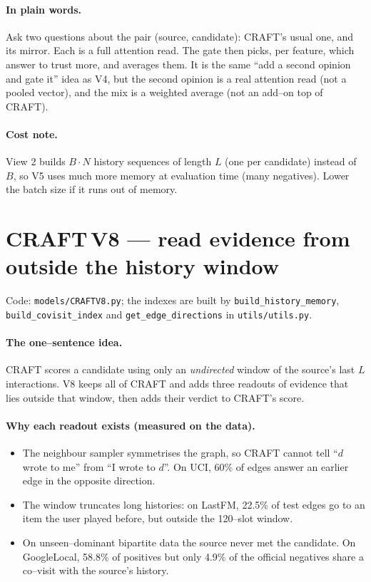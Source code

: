 \documentclass[11pt]{article}
\newcommand{\code}[1]{\texttt{\small #1}}
\begin{document}
\paragraph{In plain words.}
Ask two questions about the pair (source, candidate): CRAFT's usual one, and its
mirror. Each is a full attention read. The gate then picks, per feature, which
answer to trust more, and averages them. It is the same ``add a second opinion
and gate it'' idea as V4, but the second opinion is a real attention read (not a
pooled vector), and the mix is a weighted average (not an add--on top of CRAFT).

\paragraph{Cost note.}
View 2 builds $B\cdot N$ history sequences of length $L$ (one per candidate)
instead of $B$, so V5 uses much more memory at evaluation time (many
negatives). Lower the batch size if it runs out of memory.

\section{CRAFT\,V8 --- read evidence from outside the history window}
\label{sec:v8}

Code: \code{models/CRAFTV8.py}; the indexes are built by
\code{build\_history\_memory}, \code{build\_covisit\_index} and
\code{get\_edge\_directions} in \code{utils/utils.py}.

\paragraph{The one--sentence idea.}
CRAFT scores a candidate using only an \emph{undirected} window of the source's
last $L$ interactions. V8 keeps all of CRAFT and adds three readouts of evidence
that lies outside that window, then adds their verdict to CRAFT's score.

\paragraph{Why each readout exists (measured on the data).}
\begin{itemize}[nosep]
  \item The neighbour sampler symmetrises the graph, so CRAFT cannot tell
        ``$d$ wrote to me'' from ``I wrote to $d$''. On UCI, 60\% of edges answer an
        earlier edge in the opposite direction.
  \item The window truncates long histories: on LastFM, 22.5\% of test edges
        go to an item the user played before, but outside the 120--slot window.
  \item On unseen--dominant bipartite data the source never met the candidate.
        On GoogleLocal, 58.8\% of positives but only 4.9\% of the official
        negatives share a co--visit with the source's history.
\end{itemize}
\end{document}
